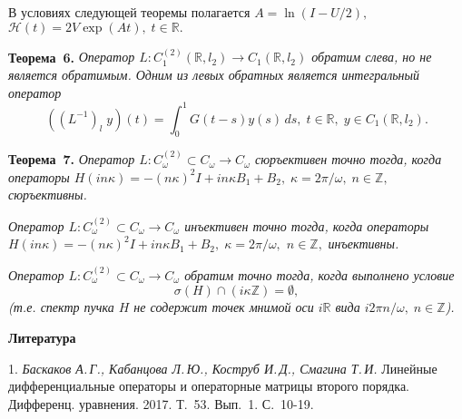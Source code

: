 В условиях следующей теоремы полагается \linebreak $A=\ln(I-U/2),$
$\mathcal{H}(t)=2V\exp(At),\;t\in \mathbb{R}.$

\textbf{Теорема~6.} {\it Оператор $L:C_{1}^{(2)}(\mathbb{R},l_2)\rightarrow C_{1}(\mathbb{R},l_2)$
 обратим слева, но не является обратимым. Одним из левых обратных является интегральный оператор}
$$((L^{-1})_l\;y)(t)=\int_0^{1}G(t-s)y(s)\,ds,\; t\in \mathbb{R},\;y\in C_{1}(\mathbb{R},l_2).$$

\textbf{Теорема~7.} {\it Оператор $L:C^{(2)}_\omega\subset C_\omega\rightarrow C_\omega$ сюръективен точно тогда,
когда операторы $H (in\kappa)=-(n\kappa)^2I+in\kappa B_1+B_2,\;\kappa=2\pi/\omega,\;n\in\mathbb{Z},$
 сюръективны.}

 \textit{Оператор $L:C^{(2)}_\omega\subset C_\omega\rightarrow C_\omega$ инъективен точно тогда,
 когда операторы $ H (in\kappa)=-(n\kappa)^2I+in\kappa B_1+B_2,\;\kappa=2\pi/\omega,$ $n\in\mathbb{Z},$}\textit{ инъективны.}

\textit{Оператор $L:C^{(2)}_\omega\subset C_\omega\rightarrow C_\omega$ обратим точно тогда, когда
выполнено условие
$$\sigma(H)\cap (i\kappa\mathbb{Z})=\emptyset,
$$
(т.е. спектр пучка $H$ не содержит точек мнимой оси $i\mathbb{R}$ вида $i2\pi n/\omega,\;n\in \mathbb{Z}$).}

\smallskip \centerline{\bf Литература}\nopagebreak

1. {\it Баскаков А.\,Г., Кабанцова Л.\,Ю., Коструб И.\,Д., Смагина Т.\,И. }
Линейные дифференциальные операторы и операторные матрицы второго порядка. Дифференц. уравнения. 2017. Т.~53. Вып.~1.
С.~10-19.
